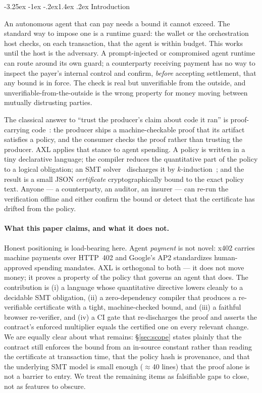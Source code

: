 \documentclass[11pt]{article}
\makeatletter
\renewcommand\section{\@startsection{section}{1}{\z@}%
  {-3.25ex \@plus -1ex \@minus -.2ex}{1.4ex \@plus.2ex}%
  {\normalfont\sffamily\Large\bfseries}}
\theoremstyle{plain}
\theoremstyle{definition}
\theoremstyle{remark}
\makeatother
\begin{document}
\section{Introduction}

An autonomous agent that can pay needs a bound it cannot exceed. The standard
way to impose one is a runtime guard: the wallet or the orchestration host
checks, on each transaction, that the agent is within budget. This works until
the host is the adversary. A prompt-injected or compromised agent runtime can
route around its own guard; a counterparty receiving payment has no way to
inspect the payer's internal control and confirm, \emph{before} accepting
settlement, that any bound is in force. The check is real but unverifiable
from the outside, and unverifiable-from-the-outside is the wrong property for
money moving between mutually distrusting parties.

The classical answer to ``trust the producer's claim about code it ran'' is
proof-carrying code~\citep{necula1997}: the producer ships a machine-checkable
proof that its artifact satisfies a policy, and the consumer checks the proof
rather than trusting the producer. AXL applies that stance to agent spending.
A policy is written in a tiny declarative language; the compiler reduces the
quantitative part of the policy to a logical obligation; an SMT
solver~\citep{demoura2008} discharges it by $k$-induction~\citep{sheeran2000};
and the result is a small JSON \emph{certificate} cryptographically bound to
the exact policy text. Anyone --- a counterparty, an auditor, an insurer ---
can re-run the verification offline and either confirm the bound or detect that
the certificate has drifted from the policy.

\paragraph{What this paper claims, and what it does not.}
Honest positioning is load-bearing here. Agent \emph{payment} is not novel:
x402 carries machine payments over HTTP~402 and Google's AP2 standardizes
human-approved spending mandates. AXL is orthogonal to both --- it does not
move money; it proves a property of the policy that governs an agent that does.
The contribution is (i) a language whose quantitative directive lowers cleanly
to a decidable SMT obligation, (ii) a zero-dependency compiler that produces a
re-verifiable certificate with a tight, machine-checked bound, and (iii) a
faithful browser re-verifier, and (iv) a CI gate that re-discharges the proof
and asserts the contract's enforced multiplier equals the certified one on every
relevant change. We are equally clear about what remains:
\S\ref{sec:scope} states plainly that the contract still enforces the bound from
an in-source constant rather than reading the certificate at transaction time,
that the policy hash is provenance, and that the underlying SMT model is small
enough ($\approx$40 lines) that the proof alone is not a barrier to entry. We
treat the remaining items as falsifiable gaps to close, not as features to
obscure.
\end{document}
